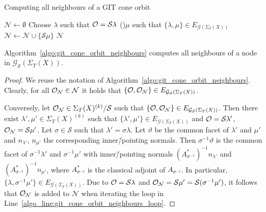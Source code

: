 \begin{algorithm}
	\caption{Computing all neighbours of a GIT cone orbit}
	\label{algo:git_cone_orbit_neighbours}
	
	\BlankLine
	$\mathcal{N} \leftarrow \emptyset$\;
	Choose $\lambda$ such that $\mathcal{O} = \mathcal{S}\lambda$\;
	\For(){$\mu$ such that $\{\lambda,\mu\}\in E_{\mathcal{G}(\Sigma_T(X))}$\label{algo_line:git_cone_orbit_neighbours_loop}}{
		$\mathcal{N}\leftarrow \mathcal{N} \cup \{\mathcal{S}\mu\}$\;
	}
	\Return $\mathcal{N}$\;
\end{algorithm}

\begin{prop}
	Algorithm~\ref{algo:git_cone_orbit_neighbours} computes all neighbours of a node in $\mathcal{G}_\mathcal{S}(\Sigma_T(X))$.
\end{prop}
\begin{proof}
	We reuse the notation of Algorithm~\ref{algo:git_cone_orbit_neighbours}. Clearly, for all  $\mathcal{O}_\mathcal{N}\in\mathcal{N}$ it holds that $\{\mathcal{O},\mathcal{O}_\mathcal{N}\}\in E_{\mathcal{G}_\mathcal{S}(\Sigma_T(X))}$.
	
	Conversely, let $\mathcal{O}_\mathcal{N}\in\Sigma_T(X)^{(k)}/\mathcal{S}$ such that $\{\mathcal{O},\mathcal{O}_\mathcal{N}\}\in E_{\mathcal{G}_\mathcal{S}(\Sigma_T(X))}$. Then there exist $\lambda',\mu'\in\Sigma_T(X)^{(k)}$ such that $\{\lambda', \mu'\}\in E_{\mathcal{G}(\Sigma_T(X))}$ and $\mathcal{O} = \mathcal{S}\lambda'$, $\mathcal{O}_\mathcal{N} = \mathcal{S}\mu'$. Let $\sigma\in\mathcal{S}$ such that $\lambda' = \sigma\lambda$. Let $\vartheta$ be the common facet of $\lambda'$ and $\mu'$ and $n_{\lambda'}$, $n_{\mu'}$ the corresponding inner\=/pointing normals. Then $\sigma^{-1}\vartheta$ is the common facet of $\sigma^{-1}\lambda'$ and $\sigma^{-1}\mu'$ with inner\=/pointing normals $(A_{\sigma^{-1}}^*)^{-1} n_{\lambda'}$ and $(A_{\sigma^{-1}}^*)^{-1} n_{\mu'}$, where $A_{\sigma^{-1}}^*$ is the classical adjoint of $A_{\sigma^{-1}}$. In particular, $\{\lambda, \sigma^{-1}\mu'\}\in E_{\mathcal{G}(\Sigma_T(X))}$. Due to $\mathcal{O} = \mathcal{S}\lambda$ and $\mathcal{O}_\mathcal{N} = \mathcal{S}\mu' = \mathcal{S}(\sigma^{-1}\mu')$, it follows that $\mathcal{O}_\mathcal{N}$ is added to $\mathcal{N}$ when iterating the loop in Line~\ref{algo_line:git_cone_orbit_neighbours_loop}.
\end{proof}


